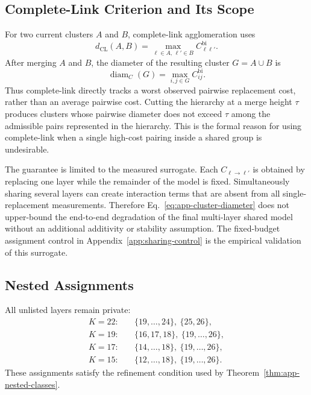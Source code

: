 \documentclass{article}
\theoremstyle{plain}
\theoremstyle{definition}
\theoremstyle{remark}
\begin{document}
\subsection{Complete-Link Criterion and Its Scope}
\label{app:complete-link-scope}

For two current clusters $A$ and $B$, complete-link agglomeration uses
\begin{equation}
  d_{\mathrm{CL}}(A,B)
  =\max_{\ell\in A,\,\ell'\in B}C^{\mathrm{bi}}_{\ell\ell'}.
  \label{eq:app-complete-link-distance}
\end{equation}
After merging $A$ and $B$, the diameter of the resulting cluster $G=A\cup B$ is
\begin{equation}
  \operatorname{diam}_{C}(G)
  =\max_{i,j\in G}C^{\mathrm{bi}}_{ij}.
  \label{eq:app-cluster-diameter}
\end{equation}
Thus complete-link directly tracks a worst observed pairwise replacement cost,
rather than an average pairwise cost.  Cutting the hierarchy at a merge height
$\tau$ produces clusters whose pairwise diameter does not exceed $\tau$ among the
admissible pairs represented in the hierarchy.  This is the formal reason for
using complete-link when a single high-cost pairing inside a shared group is
undesirable.

The guarantee is limited to the measured surrogate.  Each
$C_{\ell\to\ell'}$ is obtained by replacing one layer while the remainder of the
model is fixed.  Simultaneously sharing several layers can create interaction
terms that are absent from all single-replacement measurements.  Therefore
Eq.~\eqref{eq:app-cluster-diameter} does not upper-bound the end-to-end degradation
of the final multi-layer shared model without an additional additivity or
stability assumption.  The fixed-budget assignment control in Appendix~\ref{app:sharing-control} is the
empirical validation of this surrogate.



\subsection{Nested Assignments}
All unlisted layers remain private:
\begin{align*}
K=22:&\quad \{19,\ldots,24\},\ \{25,26\},\\
K=19:&\quad \{16,17,18\},\ \{19,\ldots,26\},\\
K=17:&\quad \{14,\ldots,18\},\ \{19,\ldots,26\},\\
K=15:&\quad \{12,\ldots,18\},\ \{19,\ldots,26\}.
\end{align*}
These assignments satisfy the refinement condition used by
Theorem~\ref{thm:app-nested-classes}.
\end{document}
